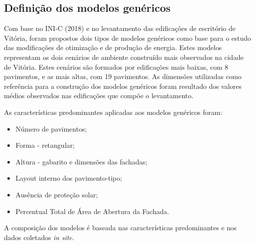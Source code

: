\subsection{Definição dos modelos genéricos}
Com base no INI-C (2018) e no levantamento das edificações de escritório de Vitória, foram propostos dois tipos de modelos genéricos como base para o estudo das modificações de otimização e de produção de energia. Estes modelos representam os dois cenários de ambiente construído mais observados na cidade de Vitória. Estes cenários são formados por edificações mais baixas, com 8 pavimentos, e as mais altas, com 19 pavimentos. As dimensões utilizadas como referência para a construção dos modelos genéricos foram resultado dos valores médios observados nas edificações que compõe o levantamento.\pagebreak

\noindent As características predominantes aplicadas aos modelos genéricos foram:
    \begin{itemize}\vspace*{-0.3cm}
        \item Número de pavimentos;\vspace*{-0.3cm}
        \item Forma - retangular;\vspace*{-0.3cm}
        \item Altura - gabarito e dimensões das fachadas;\vspace*{-0.3cm}
        \item Layout interno dos pavimento-tipo;\vspace*{-0.3cm}
        \item Ausência de proteção solar;\vspace*{-0.3cm}
        \item Percentual Total de Área de Abertura da Fachada.%
    \end{itemize}
\noindent A composição dos modelos é baseada nas características predominantes e nos dados coletados \textit{in site}.%


